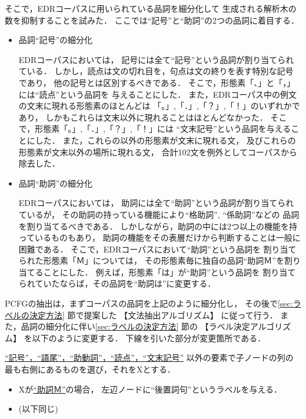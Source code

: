 そこで，EDRコーパスに用いられている品詞を細分化して
生成される解析木の数を抑制することを試みた．
ここでは``記号''と``助詞''の2つの品詞に着目する．
\begin{itemize}
\item 品詞``記号''の細分化

  \quad EDRコーパスにおいては，
  記号には全て``記号''という品詞が割り当てられている．
  しかし，読点は文の切れ目を，句点は文の終りを表す特別な記号であり，
  他の記号とは区別するべきである．
  そこで，形態素「、」と「，」には``読点''という品詞を
  与えることにした．
  また，EDRコーパス中の例文の文末に現れる形態素のほとんどは
  「。」,「．」,「？」,「！」のいずれかであり，
  しかもこれらは文末以外に現れることはほとんどなかった．
  そこで，形態素「。」,「．」,「？」,「！」には
  ``文末記号''という品詞を与えることにした．
  また，これらの以外の形態素が文末に現れる文，
  及びこれらの形態素が文末以外の場所に現れる文，
  合計102文を例外としてコーパスから除去した．

\item 品詞``助詞''の細分化

  \quad EDRコーパスにおいては，
  助詞には全て``助詞''という品詞が割り当てられているが，
  その助詞の持っている機能により``格助詞'', ``係助詞''などの
  品詞を割り当てるべきである．
  しかしながら，助詞の中には2つ以上の機能を持っているものもあり，
  助詞の機能をその表層だけから判断することは一般に困難である．
  そこで，EDRコーパスにおいて``助詞''という品詞を
  割り当てられた形態素「Ｍ」については，
  その形態素毎に独自の品詞``助詞Ｍ''を割り当てることにした．
  例えば，形態素「は」が``助詞''という品詞を
  割り当てられていたならば，その品詞を``助詞は''に変更する．
\end{itemize}

PCFGの抽出は，まずコーパスの品詞を上記のように細分化し，
その後で\ref{sec:ラベルの決定方法} 節で提案した
【文法抽出アルゴリズム】 に従って行う．
また，品詞の細分化に伴い\ref{sec:ラベルの決定方法} 節の
【ラベル決定アルゴリズム】 を以下のように変更する．
下線を引いた部分が変更箇所である．

\begin{flushleft}
  \vspace*{2mm}{\bf 【ラベル決定アルゴリズム】}\vspace*{-3mm}
\end{flushleft}

\underline{``記号''，``語尾''，``助動詞''，``読点''，``文末記号''}
以外の要素で子ノードの列の最も右側にあるものを選び，それをXとする．
\begin{itemize}
\item
  Xが\underline{``助詞Ｍ''}の場合，
  左辺ノードに``後置詞句''というラベルを与える．

\item[~] (以下同じ)
\end{itemize}

